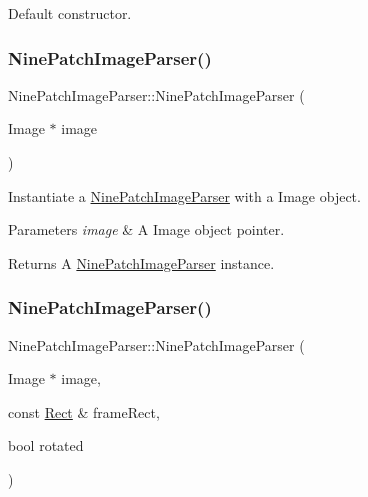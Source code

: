 Default constructor. \mbox{\label{classNinePatchImageParser_a64d01b936897a64a9cd6c5325c01f074}} 
\subsubsection{\texorpdfstring{Nine\+Patch\+Image\+Parser()}{NinePatchImageParser()}\hspace{0.1cm}{\footnotesize\ttfamily [5/6]}}
{\footnotesize\ttfamily Nine\+Patch\+Image\+Parser\+::\+Nine\+Patch\+Image\+Parser (\begin{DoxyParamCaption}\item[{Image $\ast$}]{image }\end{DoxyParamCaption})\hspace{0.3cm}{\ttfamily [explicit]}}

Instantiate a \hyperlink{classNinePatchImageParser}{Nine\+Patch\+Image\+Parser} with a Image object.


\begin{DoxyParams}{Parameters}
{\em image} & A Image object pointer.\\
\hline
\end{DoxyParams}
\begin{DoxyReturn}{Returns}
A \hyperlink{classNinePatchImageParser}{Nine\+Patch\+Image\+Parser} instance. 
\end{DoxyReturn}
\mbox{\label{classNinePatchImageParser_af6a7854a94eb39c9881b90b5c1c04e0f}} 
\subsubsection{\texorpdfstring{Nine\+Patch\+Image\+Parser()}{NinePatchImageParser()}\hspace{0.1cm}{\footnotesize\ttfamily [6/6]}}
{\footnotesize\ttfamily Nine\+Patch\+Image\+Parser\+::\+Nine\+Patch\+Image\+Parser (\begin{DoxyParamCaption}\item[{Image $\ast$}]{image,  }\item[{const \hyperlink{classRect}{Rect} \&}]{frame\+Rect,  }\item[{bool}]{rotated }\end{DoxyParamCaption})}

